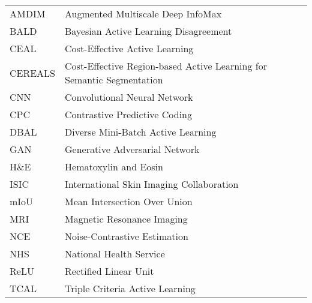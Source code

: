\begin{tabular}{ll}
AMDIM & Augmented Multiscale Deep InfoMax\\
BALD & Bayesian Active Learning Disagreement \\
CEAL & Cost-Effective Active Learning \\
CEREALS & Cost-Effective Region-based Active Learning for Semantic Segmentation \\
CNN & Convolutional Neural Network \\
CPC & Contrastive Predictive Coding \\
DBAL & Diverse Mini-Batch Active Learning \\
GAN & Generative Adversarial Network \\
H\&E & Hematoxylin and Eosin \\
ISIC & International Skin Imaging Collaboration \\
mIoU & Mean Intersection Over Union \\
MRI & Magnetic Resonance Imaging \\
NCE & Noise-Contrastive Estimation \\
NHS & National Health Service \\
ReLU & Rectified Linear Unit \\
TCAL & Triple Criteria Active Learning
\end{tabular}